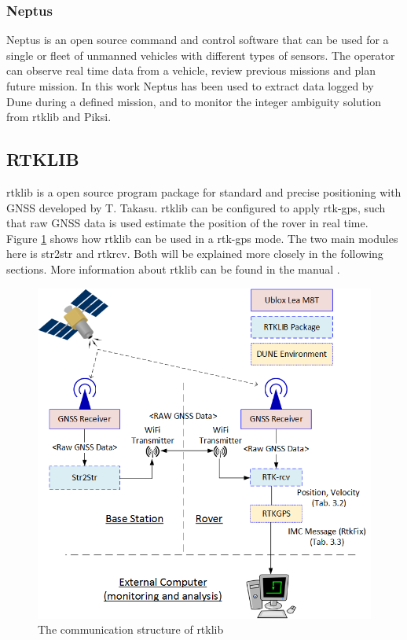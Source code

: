 \subsubsection{Neptus}
Neptus is an open source command and control software that can be used for a single or fleet of unmanned vehicles with different types of sensors. The operator can observe real time data from a vehicle, review previous missions and plan future mission. In this work Neptus has been used to extract data logged by Dune during a defined mission, and to monitor the integer ambiguity solution from \gls{rtklib} and Piksi.
\subsection{RTKLIB}\label{ss:Rtklib}
\acrfull{rtklib}\citep{takasu2009development} is a open source program package for standard and precise positioning with GNSS developed by T. Takasu. \gls{rtklib} can be configured to apply \gls{rtk-gps}, such that raw GNSS data is used estimate the position of the rover in real time. Figure \ref{figure:RTKLIB_STRUCTURE} shows how \gls{rtklib} can be used in a \gls{rtk-gps} mode. The two main modules here is str2str and rtkrcv. Both will be explained more closely in the following sections. More information about  \gls{rtklib} can be found in the manual \citep{Rtklib242}.

\begin{figure}[H]
	\centering
		\includegraphics[width=1\textwidth]{figs/RTKLIB.png}
		\caption{The communication structure of \gls{rtklib}}
		\label{figure:RTKLIB_STRUCTURE}
\end{figure}
